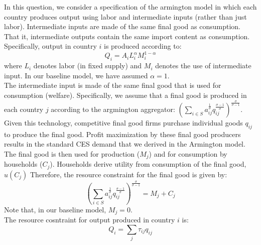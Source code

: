 \documentclass[answers]{exam}
\begin{document}
\begin{questions}
\begin{parts}
\begin{solution}
          \end{solution}

    \end{parts}
    \question In this question, we consider a specification of the armington model in which each country produces output 
    using labor and intermediate inputs (rather than just labor). Intermediate inputs are made of the same final good as consumption. That it, intermediate outputs contain the same import content as consumption.\\
    Specifically, output in country $i$ is produced according to:
    $$Q_i = A_i L_i^\alpha M_i^{1-\alpha}$$
    where $L_i$ denotes labor (in fixed supply) and $M_i$ denotes the use of intermediate input. In our baseline model, we have assumed $\alpha = 1$.\\
    The intermediate input is made of the same final good that is used for consumption (welfare). Specifically, we assume that a final good is produced in each country $j$ according to the argmington aggregator: $(\sum_{i\in S} a_{ij}^{\frac{1}{\sigma}} q_{ij}^\frac{\sigma-1}{\sigma})^{\frac{\sigma}{\sigma - 1}}$. Given this technology, 
    competitive final good firms purchase individual goods $q_{ij}$ to produce the final good.
    Profit maximization
    by these final good producers results in the standard CES demand that we derived in the
    Armington model. The final good is then used for production ($M_j$) and for consumption
    by households ($C_j$). Households derive utility from consumption of the final good, $u(C_j)$
    Therefore, the resource constraint for the final good is given by:
    $$(\sum_{i\in S} a_{ij}^{\frac{1}{\sigma}} q_{ij}^\frac{\sigma-1}{\sigma})^{\frac{\sigma}{\sigma - 1}} = M_j + C_j$$
    Note that, in our baseline model, $M_j = 0$.\\ 
    The resource cosntraint for output produced in country $i$ is:
    $$Q_i = \sum_{j} \tau_{ij} q_{ij}$$
\end{questions}
\end{document}
